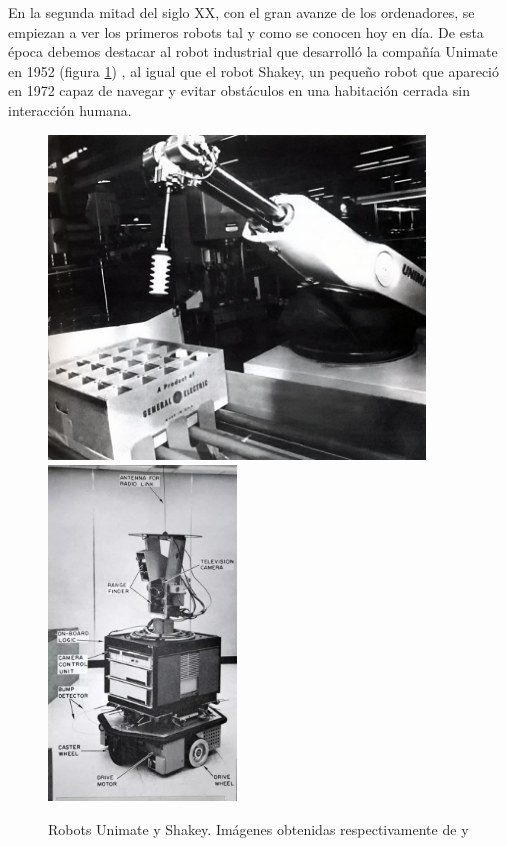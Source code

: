 \newpage
En la segunda mitad del siglo XX, con el gran avanze de los ordenadores, se empiezan a ver los primeros robots tal y como se conocen hoy en día.
De esta época debemos destacar al robot industrial que desarrolló la compañía Unimate en 1952 (figura \ref{fig:unimate_shakey}) , al igual que el robot Shakey, un pequeño robot que apareció
en 1972 capaz de navegar y evitar obstáculos en una habitación cerrada sin interacción humana.

\begin{figure} [H]
  \begin{center}
    \includegraphics[width=10cm]{figs/c1/unimate.jpg}
    \includegraphics[width=5cm]{figs/c1/shakey.jpg}
  \end{center}
  \caption[Robots Unimate y Shakey]{Robots Unimate y Shakey. Imágenes obtenidas respectivamente de \cite{unimate} y \cite{shakey}}
  \label{fig:unimate_shakey}
\end{figure}

